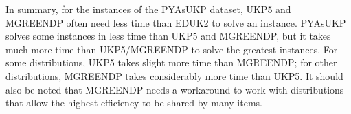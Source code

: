 In summary, for the instances of the PYAsUKP dataset, UKP5 and MGREENDP often need less time than EDUK2 to solve an instance.
PYAsUKP solves some instances in less time than UKP5 and MGREENDP, but it takes much more time than UKP5/MGREENDP to solve the greatest instances.
For some distributions, UKP5 takes slight more time than MGREENDP; for other distributions, MGREENDP takes considerably more time than UKP5.
It should also be noted that MGREENDP needs a workaround to work with distributions that allow the highest efficiency to be shared by many items.

%

